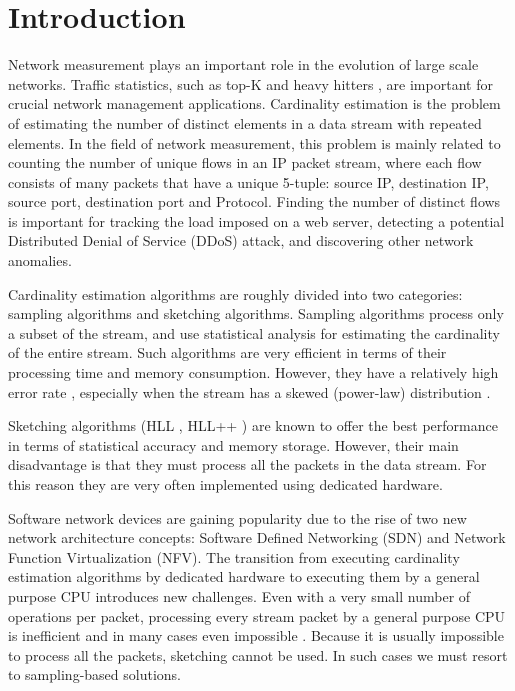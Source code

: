 
\section{Introduction} \label{sec:intro}

	Network measurement plays an important role in the evolution of large scale networks. Traffic statistics, such as top-K \cite{mouratidis2006continuous} and heavy hitters \cite{ben2016heavy}, are important for crucial network management applications. Cardinality estimation is the problem of estimating the number of distinct elements in a data stream with repeated elements. In the field of network measurement, this problem is mainly related to counting the number of unique flows in an IP packet stream, where each flow consists of many packets that have a unique 5-tuple: source IP, destination IP, source port, destination port and Protocol. Finding the number of distinct flows is important for tracking the load imposed on a web server, detecting a potential Distributed Denial of Service (DDoS) attack, and discovering other network anomalies.
	
	Cardinality estimation algorithms are roughly divided into two categories: sampling algorithms and sketching algorithms. Sampling algorithms process only a subset of the stream, and use statistical analysis for estimating the cardinality of the entire stream. Such algorithms are very efficient in terms of their processing time and memory consumption. However, they have a relatively high error rate \cite{charikar2000towards}, especially when the stream has a skewed (power-law) distribution \cite{deolalikar2016extensive}.
	
	Sketching algorithms (HLL \cite{flajolet2007hyperloglog}, HLL++ \cite{heule2013hyperloglog}) are known to offer the best performance in terms of statistical accuracy and memory storage. However, their main disadvantage is that they must process all the packets in the data stream. For this reason they are very often implemented using dedicated hardware.
	
	Software network devices are gaining popularity due to the rise of two new network architecture concepts: Software Defined Networking (SDN)  and Network Function Virtualization (NFV). The transition from executing cardinality estimation algorithms by dedicated hardware to executing them by a general purpose CPU introduces new challenges. Even with a very small number of operations per packet, processing every stream packet by a general purpose CPU is inefficient and in many cases even impossible \cite{alipourfard2015re,alipourfard2018comparison}. Because it is usually impossible to process all the packets, sketching cannot be used. In such cases we must resort to sampling-based solutions.
	

